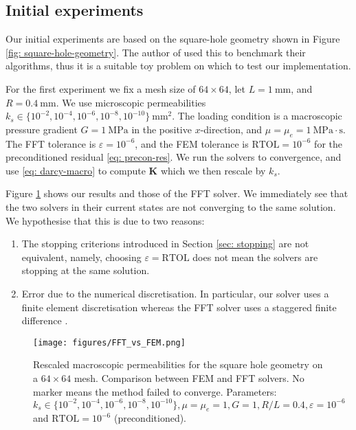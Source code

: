 \documentclass[12pt]{article}
\theoremstyle{theorem}
\begin{document}
\subsection{Initial experiments}\label{sec: initial-ex}

Our initial experiments are based on the square-hole geometry shown in Figure \ref{fig: square-hole-geometry}. The author of \cite{chen2023} used this to benchmark their algorithms, thus it is a suitable toy problem on which to test our implementation.

For the first experiment we fix a mesh size of $64 \times 64$, let $L=1~\mathrm{mm}$, and $R = 0.4~\mathrm{mm}$. We use microscopic permeabilities $k_s \in \{10^{-2}, 10^{-4}, 10^{-6}, 10^{-8}, 10^{-10}\}~\mathrm{mm}^2.$ The loading condition is a macroscopic pressure gradient $G = 1~\mathrm{MPa}$ in the positive $x$-direction, and $\mu = \mu_e = 1~\mathrm{MPa}\cdot\mathrm{s}$. The FFT tolerance is $\varepsilon=10^{-6}$, and the FEM tolerance is $\mathrm{RTOL} = 10^{-6}$ for the preconditioned residual \eqref{eq: precon-res}. We run the solvers to convergence, and use \eqref{eq: darcy-macro} to compute $\mathbf{K}$ which we then rescale by $k_s$. 

Figure \ref{fig: FFT-vs-FEM} shows our results and those of the FFT solver. We immediately see that the two solvers in their current states are not converging to the same solution. We hypothesise that this is due to two reasons:
\begin{enumerate}
    \item The stopping criterions introduced in Section \ref{sec: stopping} are not equivalent, namely, choosing $\varepsilon = \mathrm{RTOL}$ does not mean the solvers are stopping at the same solution.
    \item Error due to the numerical discretisation. In particular, our solver uses a finite element discretisation whereas the FFT solver uses a staggered finite difference \cite{chen2023}.
\end{enumerate}

\begin{figure}[h!]
    \centering
    \texttt{[image: figures/FFT\_vs\_FEM.png]}
    \caption{Rescaled macroscopic permeabilities for the square hole geometry on a $64 \times 64$ mesh. Comparison between FEM and FFT solvers. No marker means the method failed to converge. Parameters: $k_s \in \{10^{-2}, 10^{-4}, 10^{-6}, 10^{-8}, 10^{-10}\}, \mu=\mu_e = 1, G=1, R/L = 0.4, \varepsilon = 10^{-6}$ and $\mathrm{RTOL} = 10^{-6}$ (preconditioned).}
    \label{fig: FFT-vs-FEM}
\end{figure}
\end{document}
